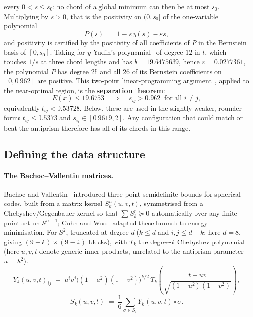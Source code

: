 \documentclass[11pt]{article}
\theoremstyle{definition}
\theoremstyle{remark}
\newcommand{\energy}{E}
\begin{document}
every $0 < s \le s_0$: no chord of a global minimum can then be at most $s_0$.
Multiplying by $s>0$, that is the positivity on $(0,s_0]$ of the one-variable
polynomial
\begin{equation}
\label{eq:lp-bernstein}
P(s) \;=\; 1 - s\,y(s) - \varepsilon s ,
\end{equation}
and positivity is certified by the positivity of all coefficients of
$P$ in the Bernstein basis of $[0,s_0]$.
Taking for $y$ Yudin's polynomial~\cite{Yud92} of degree $12$ in $t$, which touches $1/s$ at
three chord lengths and has $b = 19.6475639$, hence $\varepsilon = 0.0277361$, the polynomial $P$ has
degree 25 and all $26$ of its Bernstein coefficients on $[0,0.962]$ are
positive. This two-point linear-programming argument~\cite{DGS77,Yud92}, applied to
the near-optimal region, is the \textbf{separation theorem}:
\begin{equation}
\label{eq:separation}
\energy(x) \le 19.6753 \quad\Longrightarrow\quad s_{ij} > 0.962 \ \text{ for all } i\ne j,
\end{equation}
equivalently $t_{ij} < 0.53728$. Below, these are used in the slightly
weaker, rounder forms $t_{ij}\le0.5373$ and $s_{ij}\in[0.9619,2]$. Any
configuration that could match or beat the antiprism therefore has all of
its chords in this range.



\subsection{Defining the data structure}
\label{sec:method-bv}
\label{sec:method-datum}

\paragraph{The Bachoc--Vallentin matrices.}
Bachoc and Vallentin~\cite{BV08} introduced three-point semidefinite
bounds for spherical codes, built from a matrix kernel $S_k^n(u,v,t)$,
symmetrised from a Chebyshev/Gegenbauer kernel so that
$\sum S_k^n\succeq0$ automatically over any finite point set on
$S^{n-1}$; Cohn and Woo~\cite{CW12} adapted these bounds to energy
minimisation. For $S^2$, truncated at degree $d$ ($k\le d$ and
$i,j\le d-k$; here $d=8$, giving $(9-k)\times(9-k)$ blocks), with $T_k$
the degree-$k$ Chebyshev polynomial (here $u,v,t$ denote generic inner
products, unrelated to the antiprism parameter $u=h^2$):
\begin{equation}
  Y_k(u,v,t)_{ij} \;=\; u^i v^j \big((1-u^2)(1-v^2)\big)^{k/2}\, T_k\!\left(\frac{t-uv}{\sqrt{(1-u^2)(1-v^2)}}\right),
\end{equation}
\begin{equation}
  S_k(u,v,t) \;=\; \frac16 \sum_{\sigma \in S_3} Y_k(u,v,t)\circ\sigma.
\end{equation}
\end{document}
